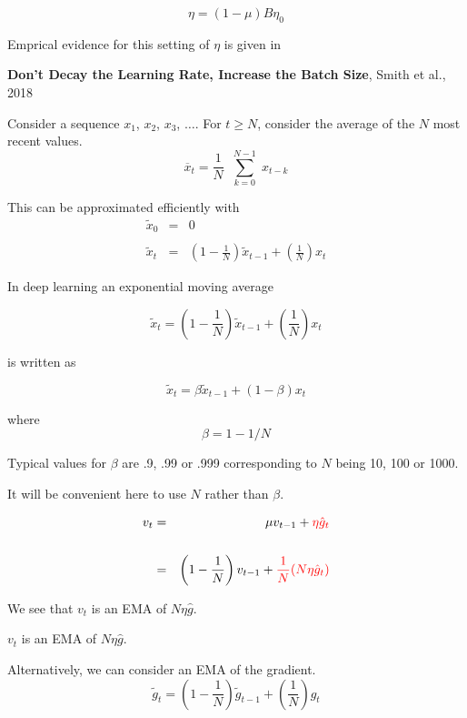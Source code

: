 {

{\color{red} $$\eta = (1-\mu)B\eta_0$$}

\vfill
Emprical evidence for this setting of $\eta$ is given in

\vfill
{\bf Don't Decay the Learning Rate, Increase the Batch Size}, Smith et al., 2018

Consider a sequence $x_1$, $x_2$, $x_3$, $\ldots$.
\vfill
For $t \geq N$, consider the average of the $N$ most recent values.
$$\overline{x}_t = \frac{1}{N} \;\; \sum_{k = 0}^{N-1}\; x_{t-k}$$

\vfill
This can be approximated efficiently with
\begin{eqnarray*}
\tilde{x}_0 & = & 0 \\
\\
\tilde{x}_t & = & \left(1-\frac{1}{N}\right)\tilde{x}_{t-1} + \left(\frac{1}{N}\right)x_t
\end{eqnarray*}


In deep learning an exponential moving average

$$\tilde{x}_t = \left(1-\frac{1}{N}\right)\tilde{x}_{t-1} + \left(\frac{1}{N}\right)x_t$$

\vfill
is written as

$$\tilde{x}_t = \beta\tilde{x}_{t-1} + (1-\beta)x_t$$

\vfill
where
$$\beta = 1 - 1/N$$

\vfill
Typical values for $\beta$ are .9, .99 or .999 corresponding to $N$ being 10, 100 or 1000.

\vfill
It will be convenient here to use $N$ rather than $\beta$.


\begin{eqnarray*}
v_t & = & \mu v_{t-1} + {\color{red} \eta \hat{g}_t} \\
\\
& = & \left(1-\frac{1}{N}\right) v_{t-1} + {\color{red} \frac{1}{N}(N\eta \hat{g}_t)}
\end{eqnarray*}

\vfill
We see that $v_t$ is an EMA of $N \eta \hat{g}$.


\centerline{\color{red} $v_t$ is an EMA of $N \eta \hat{g}$.}

\vfill
Alternatively, we can consider an EMA of the gradient.
{\color{red} $$\tilde{g}_t = \left(1-\frac{1}{N}\right)\tilde{g}_{t-1} + \left(\frac{1}{N}\right) \hat{g}_t$$}

}
